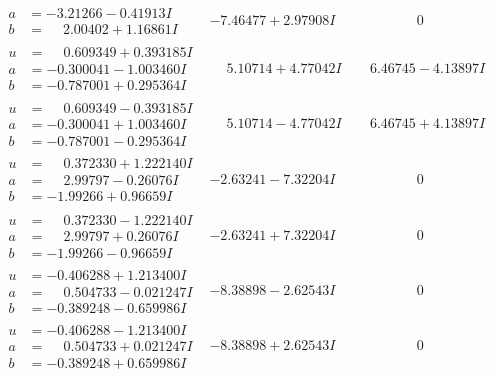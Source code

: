 \documentclass[1p]{elsarticle_modified}
\theoremstyle{definition}
\begin{document}
$$\begin{array}{c|c|c}
\begin{aligned}
a &= -3.21266 - 0.41913 I \\
b &= \phantom{-}2.00402 + 1.16861 I\end{aligned}
 & -7.46477 + 2.97908 I & \phantom{-0.000000 } 0 \\ \hline\begin{aligned}
u &= \phantom{-}0.609349 + 0.393185 I \\
a &= -0.300041 - 1.003460 I \\
b &= -0.787001 + 0.295364 I\end{aligned}
 & \phantom{-}5.10714 + 4.77042 I & \phantom{-}6.46745 - 4.13897 I \\ \hline\begin{aligned}
u &= \phantom{-}0.609349 - 0.393185 I \\
a &= -0.300041 + 1.003460 I \\
b &= -0.787001 - 0.295364 I\end{aligned}
 & \phantom{-}5.10714 - 4.77042 I & \phantom{-}6.46745 + 4.13897 I \\ \hline\begin{aligned}
u &= \phantom{-}0.372330 + 1.222140 I \\
a &= \phantom{-}2.99797 - 0.26076 I \\
b &= -1.99266 + 0.96659 I\end{aligned}
 & -2.63241 - 7.32204 I & \phantom{-0.000000 } 0 \\ \hline\begin{aligned}
u &= \phantom{-}0.372330 - 1.222140 I \\
a &= \phantom{-}2.99797 + 0.26076 I \\
b &= -1.99266 - 0.96659 I\end{aligned}
 & -2.63241 + 7.32204 I & \phantom{-0.000000 } 0 \\ \hline\begin{aligned}
u &= -0.406288 + 1.213400 I \\
a &= \phantom{-}0.504733 - 0.021247 I \\
b &= -0.389248 - 0.659986 I\end{aligned}
 & -8.38898 - 2.62543 I & \phantom{-0.000000 } 0 \\ \hline\begin{aligned}
u &= -0.406288 - 1.213400 I \\
a &= \phantom{-}0.504733 + 0.021247 I \\
b &= -0.389248 + 0.659986 I\end{aligned}
 & -8.38898 + 2.62543 I & \phantom{-0.000000 } 0 \\ \hline\begin{aligned}

\end{aligned}
\end{array}$$
\end{document}
